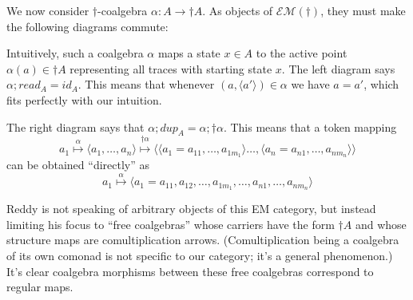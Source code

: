 \documentclass{article}
\begin{document}
We now consider $\dagger$-coalgebra $\alpha : A \to \dagger A$. As objects of $\mathcal {EM}(\dagger)$,
they must make the following diagrams commute:


Intuitively, such a coalgebra $\alpha$ maps a state $x \in A$ to the active point $\alpha(a) \in \dagger A$ representing all traces with starting state $x$. The left diagram says $\alpha;\mathit{read}_A = id_A$. This means that whenever $(a, \langle a' \rangle) \in \alpha$ we have $a = a'$, which fits perfectly with our intuition.

The right diagram says that $\alpha;\mathit{dup}_A = \alpha;\dagger \alpha$. This means that a token mapping
$$a_1 \overset{\alpha}{\mapsto} \langle a_1, \ldots, a_n \rangle \overset{\dagger \alpha}{\mapsto} 
\langle \langle a_1 = a_{11},\ldots,a_{1m_1} \rangle \ldots, \langle a_n = a_{n1},\ldots,a_{nm_n}\rangle \rangle$$
can be obtained ``directly'' as 
$$a_1 \overset{\alpha}{\mapsto} \langle a_1 = a_{11},a_{12},\ldots,a_{1m_1},\ldots,a_{n1},\ldots,a_{nm_n} \rangle$$

Reddy is not speaking of arbitrary objects of this EM category, but instead limiting his focus to 
``free coalgebras'' whose carriers have the form $\dagger A$ and whose structure maps are comultiplication arrows.
(Comultiplication being a coalgebra of its own comonad is not specific to our category; 
it's a general phenomenon.) 
It's clear coalgebra morphisms between these free coalgebras correspond to regular maps.
\begin{center}
\end{center}
\end{document}
